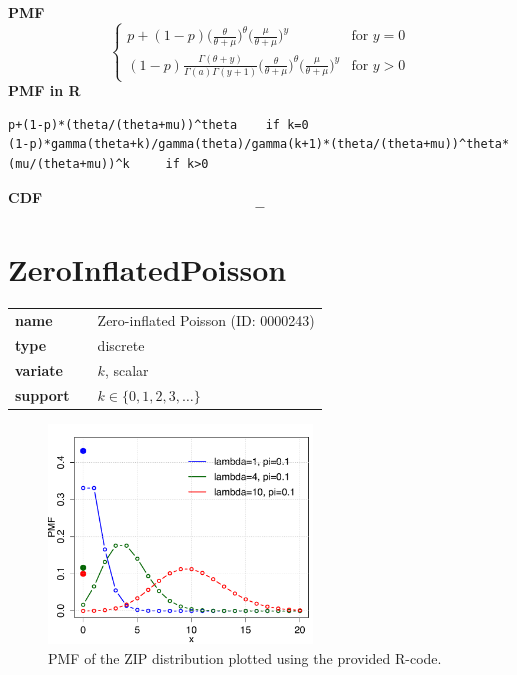 \smallskip \noindent \hspace{.2cm} \textbf{PMF} 
\begin{equation*}\begin{cases}
p + (1-p) \Big(\frac{\theta}{\theta + \mu} \Big)^{\theta} 
\Big(\frac{\mu}{\theta + \mu} \Big)^{y} & \text{for } y = 0 \\ 
(1-p) \frac{\Gamma(\theta + y)}{\Gamma(a)\Gamma(y+1)} \Big(\frac{\theta}{\theta + \mu} \Big)^{\theta} 
\Big(\frac{\mu}{\theta + \mu} \Big)^{y} & \text{for } y > 0
\end{cases}\end{equation*}
\smallskip \noindent \hspace{.2cm} \textbf{PMF in R}  
\begin{verbatim}p+(1-p)*(theta/(theta+mu))^theta	if k=0
(1-p)*gamma(theta+k)/gamma(theta)/gamma(k+1)*(theta/(theta+mu))^theta*(mu/(theta+mu))^k  	if k>0\end{verbatim}
\smallskip \noindent \hspace{.2cm} \textbf{CDF} 
\begin{equation*}-\end{equation*}
\smallskip\section*{ZeroInflatedPoisson} 

  \bigskip 

\begin{tabular}{p{2cm}cl}
\textbf{name} & & Zero-inflated Poisson (ID: 0000243)\\ 
 
\textbf{type} & & discrete \\ 

\textbf{variate} & & $k$, scalar \\ 

\textbf{support} & & $k \in \{0,1,2,3,\dots\}$
\end{tabular}

\begin{figure}[htb!]
\centering
  \includegraphics[width=70mm]{pics/ZIP_pmf.pdf}
 \caption{PMF of the ZIP distribution plotted using the provided R-code.}
 \label{fig:Poisson_pmf_cdf}
\end{figure}

